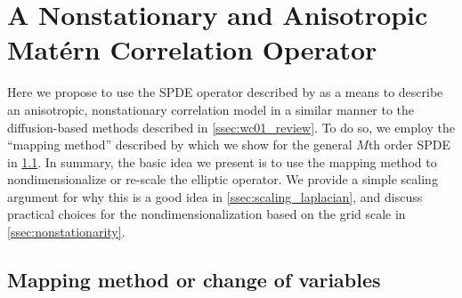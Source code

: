 \section{A Nonstationary and Anisotropic Mat\'ern Correlation Operator}
\label{sec:matern_operator}

Here we propose to use the SPDE operator described by \citet{RSSB:RSSB777}
as a means to describe an anisotropic, nonstationary correlation model in a
similar manner to the diffusion-based methods described in
\cref{ssec:wc01_review}.
To do so, we employ the ``mapping method'' described by \citet{RSSB:RSSB777}
which we show for the general $M$th order SPDE in \cref{ssec:mapping_method}.
In summary, the basic idea we present is to use the mapping method to
nondimensionalize or re-scale the elliptic operator.
We provide a simple scaling argument for why this is a good idea in
\cref{ssec:scaling_laplacian}, and discuss practical choices for the
nondimensionalization based on the grid scale in \cref{ssec:nonstationarity}.

\subsection{Mapping method or change of variables}
\label{ssec:mapping_method}

